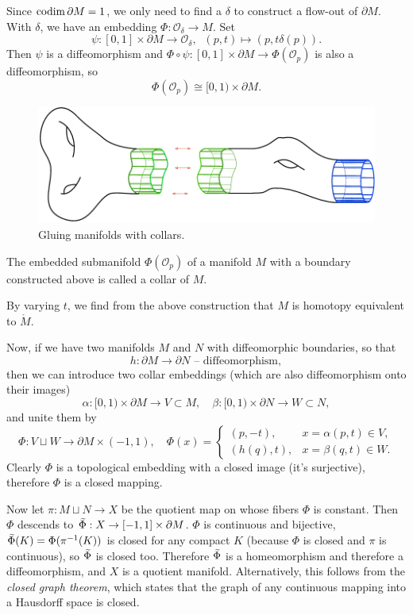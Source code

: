 Since $\operatorname{codim} \partial M=1$, we only need to find a $\delta$ to construct a flow-out of $\partial M$. With $\delta$, we have an embedding $\Phi:\mathcal{O}_\delta\to M$. Set 
\[\psi:[0,1]\times\partial M\to\mathcal{O}_\delta,\;\; (p,t)\mapsto (p,t\delta(p)).\]
Then $\psi$ is a diffeomorphism and $\Phi\circ\psi:[0,1]\times\partial M\to \Phi(\mathcal{O}_p)$ is also a diffeomorphism, so
\[\Phi(\mathcal{O}_p)\cong [0,1)\times\partial M.\]

\begin{figure}[tp]
    \centering
    \includegraphics[scale=0.2]{figures/collar.png}
    \caption{Gluing manifolds with collars.}
    \label{fig:collars}
\end{figure}

\begin{defn}[Collar]
    The embedded submanifold $\Phi(\mathcal{O}_p)$ of a manifold $M$ with a boundary constructed above is called a collar of $M$.
\end{defn}

\begin{cor}
    By varying $t$, we find from the above construction that $M$ is homotopy equivalent to $\mathring{M}$.
\end{cor}

Now, if we have two manifolds $M$ and $N$ with diffeomorphic boundaries, so that
\[h:\partial M\to \partial N\text{ -- diffeomorphism},\]
then we can introduce two collar embeddings (which are also diffeomorphism onto their images)
\[
\alpha:[0,1)\times\partial M\to V\subset M,\quad
\beta:[0,1)\times\partial N\to W\subset N,
\]
and unite them by
\[
\Phi: V\sqcup W\to \partial M\times (-1,1),\quad \Phi(x)=
\begin{cases}
(p,-t),& x=\alpha(p,t)\in V,\\
(h(q),t),& x=\beta(q,t)\in W.
\end{cases}
\]
Clearly $\Phi$  is a topological embedding with a closed image (it's surjective), therefore $\Phi$ is a closed mapping.

Now let $\pi:M\sqcup N\to X$ be the quotient map on whose fibers $\Phi$ is constant. Then $\Phi$ descends to $\wt{\Phi}:X\to [-1,1]\times\partial M$. $\Phi$ is continuous and bijective, $\wt{\Phi}(K)=\Phi(\pi^{-1}(K))$ is closed for any compact $K$ (because $\Phi$ is closed and $\pi$ is continuous), so $\wt{\Phi}$ is closed too. Therefore $\wt{\Phi}$ is a homeomorphism and therefore a diffeomorphism, and $X$ is a quotient manifold. Alternatively, this follows from the \emph{closed graph theorem}, which states that the graph of any continuous mapping into a Hausdorff space is closed.

